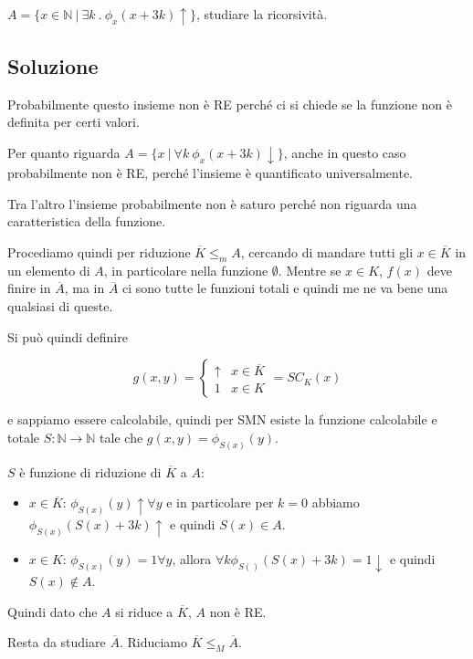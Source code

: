 $A = \{ x \in \mathbb{N} \:|\: \exists k \:.\: \phi_x(x+3k) \uparrow \}$, studiare la ricorsività.

\subsection{Soluzione}

Probabilmente questo insieme non è RE perché ci si chiede se la funzione non è definita per certi valori.

Per quanto riguarda $A = \{ x \:|\: \forall k \:\phi_x(x+3k)\downarrow \}$, anche in questo caso probabilmente non è RE, perché l'insieme è quantificato universalmente.

Tra l'altro l'insieme probabilmente non è saturo perché non riguarda una caratteristica della funzione.

Procediamo quindi per riduzione $\overline{K} \leq_m A$, cercando di mandare tutti gli $x \in \overline{K}$ in un elemento di $A$, in particolare nella funzione $\emptyset$. Mentre se $x \in K$, $f(x)$ deve finire in $\overline{A}$, ma in $\overline{A}$ ci sono tutte le funzioni totali e quindi me ne va bene una qualsiasi di queste.

Si può quindi definire

$$
g(x,y) = \begin{cases}
\uparrow & x \in \overline{K} \\
1 & x \in K
\end{cases} = SC_K(x)
$$

e sappiamo essere calcolabile, quindi per SMN esiste la funzione calcolabile e totale $S : \mathbb{N} \rightarrow \mathbb{N}$ tale che $g(x,y) = \phi_{S(x)}(y)$.

$S$ è funzione di riduzione di $\overline{K}$ a $A$:

\begin{itemize}
	\item $x \in \overline{K}$: $\phi_{S(x)} (y) \uparrow \forall y$ e in particolare per $k=0$ abbiamo $\phi_{S(x)}(S(x) + 3k)  \uparrow$ e quindi $S(x) \in A$.
	\item $x \in K$: $\phi_{S(x)}(y) = 1 \forall y $, allora $\forall k \phi_{S()}(S(x) +3k) = 1 \downarrow$ e quindi $S(x) \notin A$.
\end{itemize}

Quindi dato che $A$ si riduce a $\overline{K}$, $A$ non è RE.

Resta da studiare $\overline{A}$. Riduciamo $\overline{K} \leq_M \overline{A}$.

